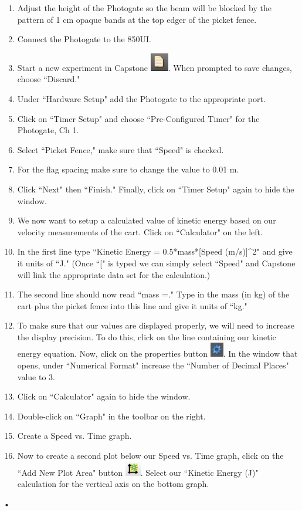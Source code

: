 \documentclass[main.tex]{subfiles}
\begin{document}
\begin{enumerate}
\item
Adjust the height of the Photogate so the beam will be blocked by the pattern of 1 cm opaque bands at the top edger of the picket fence.
\item
Connect the Photogate to the 850UI.
\item
Start a new experiment in Capstone \includegraphics{New_Experiment}. When prompted to save changes, choose ``Discard." 
\item
Under ``Hardware Setup" add the Photogate to the appropriate port.
\item
Click on ``Timer Setup" and choose ``Pre-Configured Timer" for the Photogate, Ch 1. 
\item	
Select ``Picket Fence," make sure that ``Speed" is checked.
\item
For the flag spacing make sure to change the value to 0.01 m.
\item
Click ``Next" then ``Finish." Finally, click on ``Timer Setup" again to hide the window.
\item
We now want to setup a calculated value of kinetic energy based on our velocity measurements of the cart. Click on ``Calculator" on the left.
\item
In the first line type ``Kinetic Energy = 0.5*mass*[Speed (m/s)]\^{}2" and give it units of ``J." (Once ``[" is typed we can simply select ``Speed" and Capstone will link the appropriate data set for the calculation.)
\item
The second line should now read ``mass =." Type in the mass (in kg) of the cart plus the picket fence into this line and give it units of ``kg."
\item
To make sure that our values are displayed properly, we will need to increase the display precision. To do this, click on the line containing our kinetic energy equation. Now, click on the properties button \includegraphics{Properties}. In the window that opens, under ``Numerical Format" increase the ``Number of Decimal Places" value to 3.
\item
Click on ``Calculator" again to hide the window.
\item
Double-click on ``Graph" in the toolbar on the right.
\item
Create a Speed vs. Time graph.
\item
Now to create a second plot below our Speed vs. Time graph, click on the ``Add New Plot Area" button \includegraphics{Add_New_Plot}. Select our ``Kinetic Energy (J)" calculation for the vertical axis on the bottom graph.
\end{enumerate}•
\end{document}
